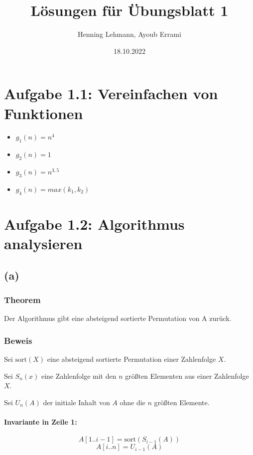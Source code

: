 \documentclass[a4paper,12pt]{article}
\title{Lösungen für Übungsblatt 1}
\author{Henning Lehmann, Ayoub Errami}
\date{18.10.2022}
\begin{document}
\maketitle
\section{Aufgabe 1.1: Vereinfachen von Funktionen}

\begin{itemize}
	\item $g_1(n)=n^4$
	\item $g_2(n)=1$
	\item $g_3(n)=n^{3,5}$
	\item $g_4(n)=max(k_1,k_2)$
\end{itemize}

\section{Aufgabe 1.2: Algorithmus analysieren}
\subsection{(a)}
\subsubsection{Theorem}

Der Algorithmus gibt eine absteigend sortierte Permutation von A zurück.

\subsubsection{Beweis}

\begin{description}
	\item{Sei $\text{sort}(X)$ eine absteigend sortierte Permutation einer Zahlenfolge $X$.}
	\item{Sei $S_n(x)$ eine Zahlenfolge mit den $n$ größten Elementen aus einer Zahlenfolge $X$.}
	\item{Sei $U_n(A)$ der initiale Inhalt von $A$ ohne die $n$ größten Elemente.}
\end{description}

\paragraph{Invariante in Zeile 1:}
$$
A[1..i-1]=\text{sort}(S_{i-1}(A))
$$
$$
A[i..n]=U_{i-1}(A)
$$
\end{document}
